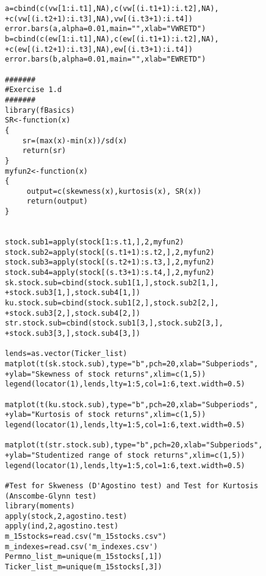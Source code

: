 \begin{small}
\begin{lstlisting}
a=cbind(c(vw[1:i.t1],NA),c(vw[(i.t1+1):i.t2],NA),
+c(vw[(i.t2+1):i.t3],NA),vw[(i.t3+1):i.t4])
error.bars(a,alpha=0.01,main="",xlab="VWRETD")
b=cbind(c(ew[1:i.t1],NA),c(ew[(i.t1+1):i.t2],NA),
+c(ew[(i.t2+1):i.t3],NA),ew[(i.t3+1):i.t4])
error.bars(b,alpha=0.01,main="",xlab="EWRETD")

#######
#Exercise 1.d
#######
library(fBasics)
SR<-function(x)
{
	sr=(max(x)-min(x))/sd(x)
	return(sr)
}
myfun2<-function(x)
{
     output=c(skewness(x),kurtosis(x), SR(x))
     return(output)
}


stock.sub1=apply(stock[1:s.t1,],2,myfun2)
stock.sub2=apply(stock[(s.t1+1):s.t2,],2,myfun2)
stock.sub3=apply(stock[(s.t2+1):s.t3,],2,myfun2)
stock.sub4=apply(stock[(s.t3+1):s.t4,],2,myfun2)
sk.stock.sub=cbind(stock.sub1[1,],stock.sub2[1,],
+stock.sub3[1,],stock.sub4[1,])
ku.stock.sub=cbind(stock.sub1[2,],stock.sub2[2,],
+stock.sub3[2,],stock.sub4[2,])
str.stock.sub=cbind(stock.sub1[3,],stock.sub2[3,],
+stock.sub3[3,],stock.sub4[3,])

lends=as.vector(Ticker_list)
matplot(t(sk.stock.sub),type="b",pch=20,xlab="Subperiods",
+ylab="Skewness of stock returns",xlim=c(1,5))
legend(locator(1),lends,lty=1:5,col=1:6,text.width=0.5)

matplot(t(ku.stock.sub),type="b",pch=20,xlab="Subperiods",
+ylab="Kurtosis of stock returns",xlim=c(1,5))
legend(locator(1),lends,lty=1:5,col=1:6,text.width=0.5)

matplot(t(str.stock.sub),type="b",pch=20,xlab="Subperiods",
+ylab="Studentized range of stock returns",xlim=c(1,5))
legend(locator(1),lends,lty=1:5,col=1:6,text.width=0.5)

#Test for Skweness (D'Agostino test) and Test for Kurtosis
(Anscombe-Glynn test)
library(moments)
apply(stock,2,agostino.test)
apply(ind,2,agostino.test)
m_15stocks=read.csv("m_15stocks.csv")
m_indexes=read.csv('m_indexes.csv')
Permno_list_m=unique(m_15stocks[,1])
Ticker_list_m=unique(m_15stocks[,3])


\end{lstlisting}
\end{small}
